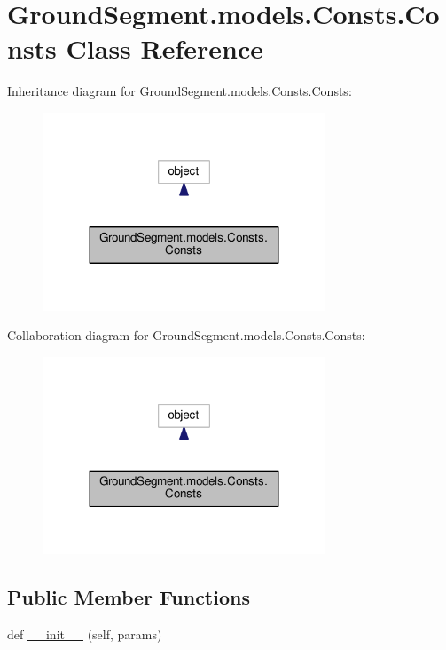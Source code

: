 \hypertarget{class_ground_segment_1_1models_1_1_consts_1_1_consts}{}\section{Ground\+Segment.\+models.\+Consts.\+Consts Class Reference}
\label{class_ground_segment_1_1models_1_1_consts_1_1_consts}


Inheritance diagram for Ground\+Segment.\+models.\+Consts.\+Consts\+:\nopagebreak
\begin{figure}[H]
\begin{center}
\leavevmode
\includegraphics[width=239pt]{class_ground_segment_1_1models_1_1_consts_1_1_consts__inherit__graph}
\end{center}
\end{figure}


Collaboration diagram for Ground\+Segment.\+models.\+Consts.\+Consts\+:\nopagebreak
\begin{figure}[H]
\begin{center}
\leavevmode
\includegraphics[width=239pt]{class_ground_segment_1_1models_1_1_consts_1_1_consts__coll__graph}
\end{center}
\end{figure}
\subsection*{Public Member Functions}
\begin{DoxyCompactItemize}
\item 
def \hyperlink{class_ground_segment_1_1models_1_1_consts_1_1_consts_aa33a4fc7efc617dfce5d38876e9eb5b0}{\+\_\+\+\_\+init\+\_\+\+\_\+} (self, params)
\end{DoxyCompactItemize}
